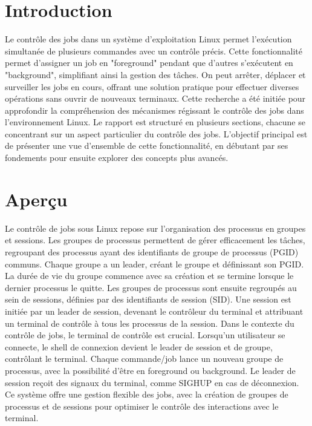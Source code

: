 \section{Introduction}
Le contrôle des jobs dans un système d'exploitation Linux permet l'exécution simultanée de plusieurs commandes avec un contrôle précis. Cette fonctionnalité permet d'assigner un job en "foreground" pendant que d'autres s'exécutent en "background", simplifiant ainsi la gestion des tâches. On peut arrêter, déplacer et surveiller les jobs en cours, offrant une solution pratique pour effectuer diverses opérations sans ouvrir de nouveaux terminaux.
\newline
Cette recherche a été initiée pour approfondir la compréhension des mécanismes régissant le contrôle des jobs dans l'environnement Linux. Le rapport est structuré en plusieurs sections, chacune se concentrant sur un aspect particulier du contrôle des jobs. L'objectif principal est de présenter une vue d'ensemble de cette fonctionnalité, en débutant par ses fondements pour ensuite explorer des concepts plus avancés.
\newline

\section{Aperçu}
Le contrôle de jobs sous Linux repose sur l'organisation des processus en groupes et sessions. Les groupes de processus permettent de gérer efficacement les tâches, regroupant des processus ayant des identifiants de groupe de processus (PGID) communs. Chaque groupe a un leader, créant le groupe et définissant son PGID. La durée de vie du groupe commence avec sa création et se termine lorsque le dernier processus le quitte.
\newline
Les groupes de processus sont ensuite regroupés au sein de sessions, définies par des identifiants de session (SID). Une session est initiée par un leader de session, devenant le contrôleur du terminal et attribuant un terminal de contrôle à tous les processus de la session.
\newline
Dans le contexte du contrôle de jobs, le terminal de contrôle est crucial. Lorsqu'un utilisateur se connecte, le shell de connexion devient le leader de session et de groupe, contrôlant le terminal. Chaque commande/job lance un nouveau groupe de processus, avec la possibilité d'être en foreground ou background. Le leader de session reçoit des signaux du terminal, comme SIGHUP en cas de déconnexion.
\newline
Ce système offre une gestion flexible des jobs, avec la création de groupes de processus et de sessions pour optimiser le contrôle des interactions avec le terminal.
